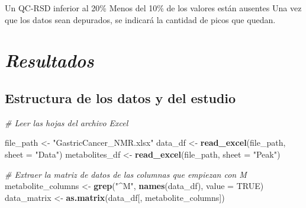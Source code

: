 \documentclass[
]{article}
\newenvironment{Shaded}{\begin{snugshade}}{\end{snugshade}}
\newcommand{\AttributeTok}[1]{\textcolor[rgb]{0.13,0.29,0.53}{#1}}
\newcommand{\CommentTok}[1]{\textcolor[rgb]{0.56,0.35,0.01}{\textit{#1}}}
\newcommand{\ConstantTok}[1]{\textcolor[rgb]{0.56,0.35,0.01}{#1}}
\newcommand{\FunctionTok}[1]{\textcolor[rgb]{0.13,0.29,0.53}{\textbf{#1}}}
\newcommand{\NormalTok}[1]{#1}
\newcommand{\OtherTok}[1]{\textcolor[rgb]{0.56,0.35,0.01}{#1}}
\newcommand{\SpecialCharTok}[1]{\textcolor[rgb]{0.81,0.36,0.00}{\textbf{#1}}}
\newcommand{\StringTok}[1]{\textcolor[rgb]{0.31,0.60,0.02}{#1}}
\begin{document}
Un QC-RSD inferior al 20\% Menos del 10\% de los valores están ausentes
Una vez que los datos sean depurados, se indicará la cantidad de picos
que quedan.

\section{\texorpdfstring{\emph{Resultados}}{Resultados}}\label{resultados}

\subsection{Estructura de los datos y del
estudio}\label{estructura-de-los-datos-y-del-estudio}

\begin{Shaded}
\begin{Highlighting}[]
\CommentTok{\# Leer las hojas del archivo Excel}

\NormalTok{file\_path }\OtherTok{\textless{}{-}} \StringTok{"GastricCancer\_NMR.xlsx"}
\NormalTok{data\_df }\OtherTok{\textless{}{-}} \FunctionTok{read\_excel}\NormalTok{(file\_path, }\AttributeTok{sheet =} \StringTok{"Data"}\NormalTok{)}
\NormalTok{metabolites\_df }\OtherTok{\textless{}{-}} \FunctionTok{read\_excel}\NormalTok{(file\_path, }\AttributeTok{sheet =} \StringTok{"Peak"}\NormalTok{)}
\end{Highlighting}
\end{Shaded}

\begin{Shaded}
\end{Shaded}

\begin{Shaded}
\begin{Highlighting}[]
\CommentTok{\# Extraer la matriz de datos de las columnas que empiezan con \textquotesingle{}M\textquotesingle{}}
\NormalTok{metabolite\_columns }\OtherTok{\textless{}{-}} \FunctionTok{grep}\NormalTok{(}\StringTok{"\^{}M"}\NormalTok{, }\FunctionTok{names}\NormalTok{(data\_df), }\AttributeTok{value =} \ConstantTok{TRUE}\NormalTok{)}
\NormalTok{data\_matrix }\OtherTok{\textless{}{-}} \FunctionTok{as.matrix}\NormalTok{(data\_df[, metabolite\_columns])}
\end{Highlighting}
\end{Shaded}
\end{document}
